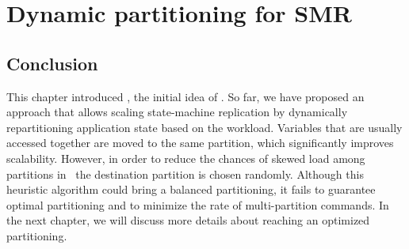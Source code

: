\chapter[Dynamic partitioning for SMR]{Dynamic partitioning for SMR}
\label{sec:dssmr}









\section{Conclusion}
\label{sec:dssmr-conclusion}
This chapter introduced \dssmr, the initial idea of \dynastar. So far, we have
proposed an approach that allows scaling state-machine replication by
dynamically repartitioning application state based on the workload.  Variables
that are usually accessed together are moved to the same partition, which
significantly improves scalability. However, in order to reduce the chances of
skewed load among partitions in \dssmr\, the destination partition is chosen
randomly. Although this heuristic algorithm could bring a balanced partitioning,
it fails to guarantee optimal partitioning and to minimize the rate of
multi-partition commands. In the next chapter, we will discuss more details
about reaching an optimized partitioning.
